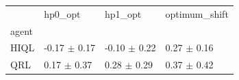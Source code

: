 \begin{tabular}{llll}
\toprule
 & hp0_opt & hp1_opt & optimum_shift \\
agent &  &  &  \\
\midrule
HIQL & -0.17 $\pm$ 0.17 & -0.10 $\pm$ 0.22 & 0.27 $\pm$ 0.16 \\
QRL & 0.17 $\pm$ 0.37 & 0.28 $\pm$ 0.29 & 0.37 $\pm$ 0.42 \\
\bottomrule
\end{tabular}
